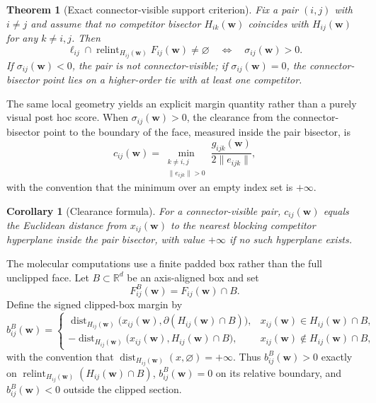 \documentclass[preprint,12pt]{elsarticle}
\newtheorem{theorem}{Theorem}
\newtheorem{corollary}{Corollary}
\newcommand{\R}{\mathbb{R}}
\newcommand{\weights}{\mathbf{w}}
\newcommand{\relint}{\operatorname{relint}}
\begin{document}
\begin{theorem}[Exact connector-visible support criterion]
\label{thm:connector_visibility_main}
Fix a pair $(i,j)$ with $i\neq j$ and assume that no competitor bisector
$H_{ik}(\weights)$ coincides with $H_{ij}(\weights)$ for any $k\neq i,j$.
Then
\begin{equation}
    \ell_{ij}\cap \relint_{H_{ij}(\weights)} F_{ij}(\weights)\neq \varnothing
    \quad\Longleftrightarrow\quad
    \sigma_{ij}(\weights)>0.
\end{equation}
If $\sigma_{ij}(\weights)<0$, the pair is not connector-visible; if
$\sigma_{ij}(\weights)=0$, the connector-bisector point lies on a higher-order
tie with at least one competitor.
\end{theorem}

The same local geometry yields an explicit margin quantity rather than a purely
visual post hoc score. When $\sigma_{ij}(\weights)>0$, the clearance from the
connector-bisector point to the boundary of the face, measured inside the pair
bisector, is
\begin{equation}
    c_{ij}(\weights)=
    \min_{\substack{k\neq i,j\\ \lVert e_{ijk}\rVert>0}}
    \frac{g_{ijk}(\weights)}{2\lVert e_{ijk}\rVert},
\end{equation}
with the convention that the minimum over an empty index set is $+\infty$.

\begin{corollary}[Clearance formula]
\label{cor:clearance_main}
For a connector-visible pair, $c_{ij}(\weights)$ equals the Euclidean distance
from $x_{ij}(\weights)$ to the nearest blocking competitor hyperplane inside
the pair bisector, with value $+\infty$ if no such hyperplane exists.
\end{corollary}

The molecular computations use a finite padded box rather than the full
unclipped face. Let $B\subset\R^d$ be an axis-aligned box and set
\begin{equation}
    F_{ij}^B(\weights)=F_{ij}(\weights)\cap B.
\end{equation}
Define the signed clipped-box margin by
\begin{equation}
    b_{ij}^B(\weights)=
    \begin{cases}
        \operatorname{dist}_{H_{ij}(\weights)}
        \bigl(x_{ij}(\weights),\partial(H_{ij}(\weights)\cap B)\bigr),
        & x_{ij}(\weights)\in H_{ij}(\weights)\cap B,\\[0.5ex]
        -\operatorname{dist}_{H_{ij}(\weights)}
        \bigl(x_{ij}(\weights),H_{ij}(\weights)\cap B\bigr),
        & x_{ij}(\weights)\notin H_{ij}(\weights)\cap B,
    \end{cases}
\end{equation}
with the convention that
$\operatorname{dist}_{H_{ij}(\weights)}(x,\varnothing)=+\infty$. Thus
$b_{ij}^B(\weights)>0$ exactly on
$\operatorname{relint}_{H_{ij}(\weights)}(H_{ij}(\weights)\cap B)$,
$b_{ij}^B(\weights)=0$ on its relative boundary, and
$b_{ij}^B(\weights)<0$ outside the clipped section.
\end{document}

